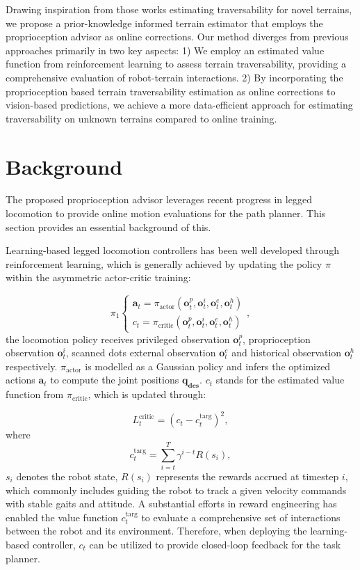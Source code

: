 \documentclass[conference]{IEEEtran}
\begin{document}
{Drawing inspiration from those works estimating traversability for novel terrains, we propose a prior-knowledge informed terrain estimator that employs the proprioception advisor as online corrections. Our method diverges from previous approaches primarily in two key aspects: 1) We employ an estimated value function from reinforcement learning to assess terrain traversability, providing a comprehensive evaluation of robot-terrain interactions. 2) By incorporating the proprioception based terrain traversability estimation as online corrections to vision-based predictions, we achieve a more data-efficient approach for estimating traversability on unknown terrains compared to online training.}

\section{{Background}}

{The proposed proprioception advisor leverages recent progress in legged locomotion to provide online motion evaluations for the path planner. This section provides an essential background of this.}

{Learning-based legged locomotion controllers has been well developed through reinforcement learning, which is generally achieved by updating the policy ${\pi}$ within the asymmetric actor-critic training:}

{\begin{equation}
{\pi_1}\left\{
\begin{aligned}
\bm{a}_t={\pi_{\textrm{actor}}}(\bm{o}_t^p,\bm{o}_t^i,\bm{o}_t^e,\bm{o}_t^h)\\
c_t={\pi_{\textrm{critic}}}(\bm{o}_t^p,\bm{o}_t^i,\bm{o}_t^e,\bm{o}_t^h)
\end{aligned}
\right.,
\label{eq}\end{equation}}
{the locomotion policy receives privileged observation ${\bm{o}_t^p}$, proprioception observation ${\bm{o}_t^i}$, scanned dots external observation ${\bm{o}_t^e}$ and historical observation ${\bm{o}_t^h}$ respectively. ${\pi_{\textrm{actor}}}$ is modelled as a Gaussian policy and infers the optimized actions $\bm{a}_t$ to compute the joint positions $\bm{q_\textrm{des}}$. $c_t$ stands for the estimated value function from $\pi_{\textrm{critic}}$, which is updated through:}

{
\begin{equation}
    L^\textrm{critic}_t=(c_t-c_t^\textrm{targ})^2,
\end{equation}
where \begin{equation}
    c_t^\textrm{targ}=\sum_{i=t}^T\gamma^{i-t}R(s_i),
    \label{c_t}
\end{equation}}
{${s_i}$ denotes the robot state, $R(s_i)$ represents the rewards accrued at timestep $i$, which commonly includes guiding the robot to track a given velocity commands with stable gaits and attitude. A substantial efforts in reward engineering has enabled the value function $c_t^\textrm{targ}$ to evaluate a comprehensive set of interactions between the robot and its environment. Therefore, when deploying the learning-based controller, $c_t$ can be utilized to provide closed-loop feedback for the task planner.}
\end{document}
